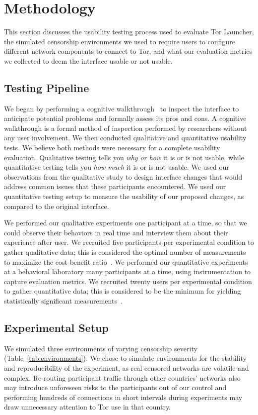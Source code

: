 \documentclass[USenglish,oneside,twocolumn]{article}
\begin{document}
\section{Methodology} 
This section discusses the usability testing process used to evaluate Tor Launcher, the simulated censorship environments we used to require users to configure different network components to connect to Tor, and what our evaluation metrics  we collected to deem the interface usable or not usable.

\subsection{Testing Pipeline} 
We began by performing a cognitive walkthrough~\cite{wharton1994cognitive,cognitive-walkthrough} to inspect the interface to anticipate potential problems and formally assess its pros and cons. A cognitive walkthrough is a formal method of inspection performed by researchers without any user involvement. We then conducted qualitative and quantitative usability tests. We believe both methods were necessary for a complete usability evaluation. Qualitative testing tells you {\it why or how} it is or is not usable, while quantitative testing tells you {\it how much} it is or is not usable. We used our observations from the qualitative study to design interface changes that would address common issues that these participants encountered. We used our quantitative testing setup to measure the usability of our proposed changes, as compared to the original interface.

We performed our qualitative experiments one participant at a time, so that we could observe their behaviors in real time and interview them about their experience after user. We recruited five participants per experimental condition to gather qualitative data; this is considered the optimal number of measurements to maximize the cost-benefit ratio~\cite{howmanyusers}. We performed our quantitative experiments at a behavioral laboratory many participants at a time, using instrumentation to capture evaluation metrics. We recruited twenty users per experimental condition to gather quantitative data; this is considered to be the minimum for yielding statistically significant measurements~\cite{howmanyusers}. 

\subsection{Experimental Setup}
\label{sec:environments}
We simulated three environments of varying censorship severity (Table~\ref{tab:environments}). We chose to 
simulate environments for the stability and reproducibility of the experiment, as real censored networks are volatile and complex. Re-routing participant traffic through other countries' networks also may introduce unforeseen risks to the participants out of our control and performing hundreds of connections in short intervals during experiments may draw unnecessary attention to Tor use in that country. 
\end{document}
